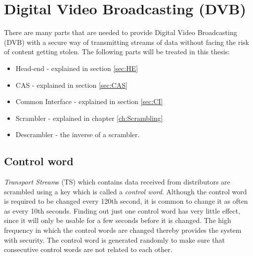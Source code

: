 \chapter{Digital Video Broadcasting (DVB)}
There are many parts that are needed to provide Digital Video 
Broadcasting (DVB) with a secure way of transmitting streams of data 
without facing the risk of content getting stolen. The following parts 
will be treated in this thesis:

\begin{itemize}
\item Head-end - explained in section \ref{sec:HE}
\item CAS - explained in section \ref{sec:CAS}
\item Common Interface - explained in section \ref{sec:CI}
\item Scrambler - explained in chapter \ref{ch:Scrambling}
\item Descrambler - the inverse of a scrambler.
\end{itemize}


\section{Control word} \label{sec:setup}
\emph{Transport Stream}s (TS) which contains data received from 
distributors are scrambled using a key which is called a 
\emph{control word}. Although the control word is required to be changed
every 120th second, it is common to change it as often as every 
10th seconds. Finding out just one control word has very little effect, 
since it will only be usable for a few seconds before it is changed. 
The high frequency in which the control words are changed thereby 
provides the system with security. The control word is generated 
randomly to make sure that consecutive control words are not related 
to each other.

